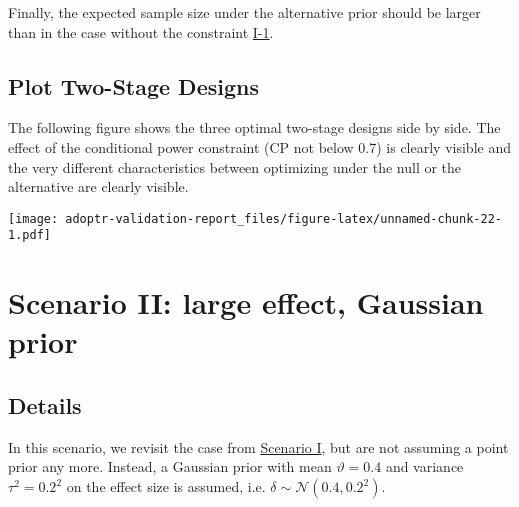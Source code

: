 \documentclass[]{book}
\newenvironment{Shaded}{\begin{snugshade}}{\end{snugshade}}
\newcommand{\DecValTok}[1]{\textcolor[rgb]{0.00,0.00,0.81}{#1}}
\newcommand{\KeywordTok}[1]{\textcolor[rgb]{0.13,0.29,0.53}{\textbf{#1}}}
\newcommand{\NormalTok}[1]{#1}
\newcommand{\OperatorTok}[1]{\textcolor[rgb]{0.81,0.36,0.00}{\textbf{#1}}}
\newcommand{\StringTok}[1]{\textcolor[rgb]{0.31,0.60,0.02}{#1}}
\begin{document}
Finally, the expected sample size under the alternative prior should
be larger than in the case without the constraint \protect\hyperlink{variantI_1}{I-1}.

\begin{Shaded}
\end{Shaded}

\hypertarget{plot-two-stage-designs}{%
\section{Plot Two-Stage Designs}\label{plot-two-stage-designs}}

The following figure shows the three optimal two-stage designs side by
side.
The effect of the conditional power constraint (CP not below 0.7) is
clearly visible and the very different characteristics between
optimizing under the null or the alternative are clearly visible.

\texttt{[image: adoptr-validation-report\_files/figure-latex/unnamed-chunk-22-1.pdf]}

\hypertarget{scenarioII}{%
\chapter{Scenario II: large effect, Gaussian prior}\label{scenarioII}}

\hypertarget{details-1}{%
\section{Details}\label{details-1}}

In this scenario, we revisit the case from \protect\hyperlink{scenarioI}{Scenario I}, but
are not assuming a point prior any more.
Instead, a Gaussian prior with mean \(\vartheta = 0.4\) and
variance \(\tau^2 = 0.2^2\) on the effect size is assumed, i.e.
\(\delta \sim \mathcal{N} (0.4, 0.2^2)\).
\end{document}
